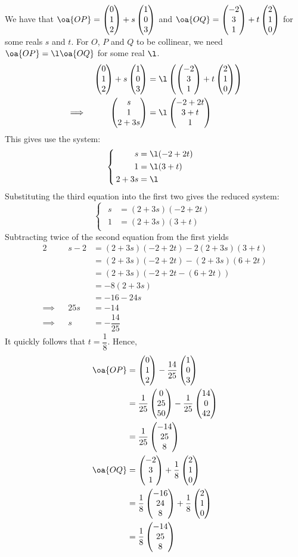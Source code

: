 \documentclass{echw}
\begin{document}
    \solution
        We have that $\oa{OP} = \cveciii012 + s\cveciii103$ and $\oa{OQ} = \cveciii{-2}31 + t\cveciii210$ for some reals $s$ and $t$. For $O$, $P$ and $Q$ to be collinear, we need $\oa{OP} = \l \oa{OQ}$ for some real $\l$.
        \begin{alignat*}{2}
            &&\cveciii012 + s\cveciii103 &= \l\left(\cveciii{-2}31 + t\cveciii210\right)\\
            \implies&&\cveciii{s}1{2 + 3s} &= \l\cveciii{-2+2t}{3+t}1
        \end{alignat*}
        This gives use the system:
        \begin{equation*}
            \begin{cases}
                \begin{aligned}
                    s &= \l (-2 + 2t)\\
                    1 &= \l(3 + t)\\
                    2 + 3s &= \l 
                \end{aligned}
            \end{cases}
        \end{equation*}
        Substituting the third equation into the first two gives the reduced system:
        \begin{equation*}
            \begin{cases}
                \begin{aligned}
                    s &= (2+3s)(-2+2t)\\
                    1 &= (2+3s)(3+t)
                \end{aligned}
            \end{cases}
        \end{equation*}
        Subtracting twice of the second equation from the first yields
        \begin{alignat*}{2}
            &&s - 2 &= (2+3s)(-2+2t) - 2(2+3s)(3+t)\\
            && &= (2+3s)(-2+2t) - (2+3s)(6+2t)\\
            && &= (2+3s)(-2+2t - (6+2t))\\
            && &= -8(2+3s)\\
            && &= -16 - 24s\\
            \implies&&25s &= -14\\
            \implies&&s &= -\dfrac{14}{25}
        \end{alignat*}
        It quickly follows that $t = \dfrac18$. Hence,
        \begin{align*}
            \oa{OP} &= \cveciii012 - \dfrac{14}{25}\cveciii103\\
            &= \dfrac1{25}\cveciii0{25}{50} - \dfrac1{25}\cveciii{14}0{42}\\
            &= \dfrac1{25}\cveciii{-14}{25}{8}\\
            \oa{OQ} &= \cveciii{-2}31 + \dfrac18\cveciii210\\
            &= \dfrac18 \cveciii{-16}{24}{8} + \dfrac18 \cveciii210\\
            &= \dfrac18 \cveciii{-14}{25}8
        \end{align*}
\end{document}
